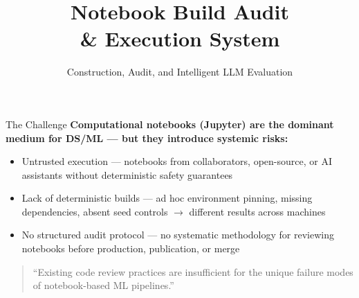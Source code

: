 \documentclass[11pt, aspectratio=169]{beamer}
\title{Notebook Build Audit \\ \& Execution System}
\subtitle{Construction, Audit, and Intelligent LLM Evaluation}
\date{}
\begin{document}
\maketitle

\begin{frame}{The Challenge}
  \textbf{Computational notebooks (Jupyter) are the dominant medium for DS/ML --- but they introduce systemic risks:}

  \vspace{0.4cm}
  \begin{itemize}
    \item \alert{Untrusted execution} --- notebooks from collaborators, open-source, or AI
      assistants without deterministic safety guarantees

    \item \alert{Lack of deterministic builds} --- ad hoc environment pinning, missing
      dependencies, absent seed controls $\rightarrow$ different results across machines

    \item \alert{No structured audit protocol} --- no systematic methodology for reviewing
      notebooks before production, publication, or merge
  \end{itemize}

  \vspace{0.5cm}
  \begin{quote}
    ``Existing code review practices are insufficient for the unique failure modes of
    notebook-based ML pipelines.''
  \end{quote}
\end{frame}
\end{document}
